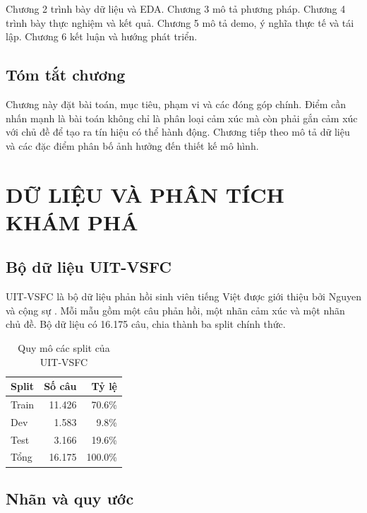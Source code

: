 \documentclass[12pt,a4paper]{report}
\begin{document}
Chương 2 trình bày dữ liệu và EDA. Chương 3 mô tả phương pháp. Chương 4 trình bày thực nghiệm và kết quả. Chương 5 mô tả demo, ý nghĩa thực tế và tái lập. Chương 6 kết luận và hướng phát triển.


\section*{Tóm tắt chương}
Chương này đặt bài toán, mục tiêu, phạm vi và các đóng góp chính. Điểm cần nhấn mạnh là bài toán không chỉ là phân loại cảm xúc mà còn phải gắn cảm xúc với chủ đề để tạo ra tín hiệu có thể hành động. Chương tiếp theo mô tả dữ liệu và các đặc điểm phân bố ảnh hưởng đến thiết kế mô hình.


\chapter{DỮ LIỆU VÀ PHÂN TÍCH KHÁM PHÁ}

\section{Bộ dữ liệu UIT-VSFC}

UIT-VSFC là bộ dữ liệu phản hồi sinh viên tiếng Việt được giới thiệu bởi Nguyen và cộng sự \cite{uitvsfc}. Mỗi mẫu gồm một câu phản hồi, một nhãn cảm xúc và một nhãn chủ đề. Bộ dữ liệu có 16.175 câu, chia thành ba split chính thức.

\begin{table}[H]
\centering
\caption{Quy mô các split của UIT-VSFC}
\begin{tabular}{@{}lrr@{}}
\toprule
\textbf{Split} & \textbf{Số câu} & \textbf{Tỷ lệ} \\
\midrule
Train & 11.426 & 70.6\% \\
Dev & 1.583 & 9.8\% \\
Test & 3.166 & 19.6\% \\
\midrule
Tổng & 16.175 & 100.0\% \\
\bottomrule
\end{tabular}
\end{table}

\section{Nhãn và quy ước}
\end{document}
